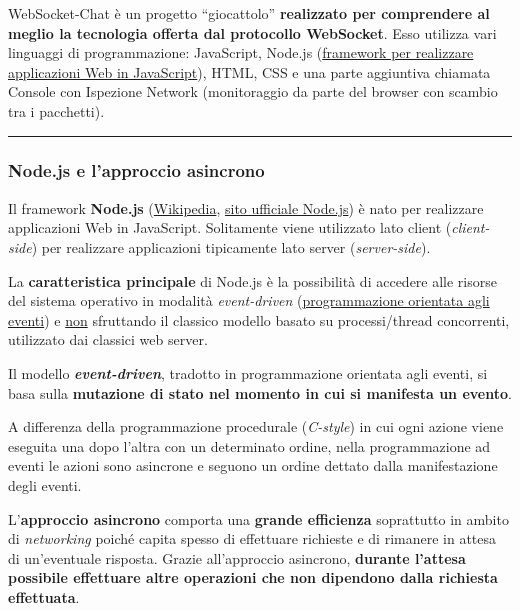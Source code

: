 \documentclass[a4paper]{article}
\newcommand{\longline}{\noindent\rule{\textwidth}{0.4pt}}
\newcommand{\dquotes}[1]{``#1''}
\begin{document}
	WebSocket-Chat è un progetto \dquotes{giocattolo} \textbf{realizzato per comprendere al meglio la tecnologia offerta dal protocollo WebSocket}. Esso utilizza vari linguaggi di programmazione: JavaScript, Node.js (\href{https://it.wikipedia.org/wiki/Node.js}{framework per realizzare applicazioni Web in JavaScript}), HTML, CSS e una parte aggiuntiva chiamata Console con Ispezione Network (monitoraggio da parte del browser con scambio tra i pacchetti).
	
	\longline
	
	\subsubsection{Node.js e l'approccio asincrono}
	
	Il framework \textcolor{Red3}{\textbf{Node.js}} (\href{https://it.wikipedia.org/wiki/Node.js}{Wikipedia}, \href{https://nodejs.org/it}{sito ufficiale Node.js}) è nato per realizzare applicazioni Web in JavaScript. Solitamente viene utilizzato lato client (\emph{client-side}) per realizzare applicazioni tipicamente lato server (\emph{server-side}).\newline
	
	\noindent
	La \textbf{caratteristica principale} di Node.js è la possibilità di accedere alle risorse del sistema operativo in modalità \emph{event-driven} (\href{https://it.wikipedia.org/wiki/Programmazione_a_eventi}{programmazione orientata agli eventi}) e \underline{non} sfruttando il classico modello basato su processi/thread concorrenti, utilizzato dai classici web server.\newline
	
	\noindent
	Il modello \textbf{\emph{event-driven}}, tradotto in programmazione orientata agli eventi, si basa sulla \textbf{mutazione di stato nel momento in cui si manifesta un evento}.
	
	A differenza della programmazione procedurale (\emph{C-style}) in cui ogni azione viene eseguita una dopo l'altra con un determinato ordine, nella programmazione ad eventi le azioni sono asincrone e seguono un ordine dettato dalla manifestazione degli eventi.\newline
	
	\noindent
	L'\textbf{approccio asincrono} comporta una \textcolor{Green4}{\textbf{grande efficienza}} soprattutto in ambito di \emph{networking} poiché capita spesso di effettuare richieste e di rimanere in attesa di un'eventuale risposta. Grazie all'approccio asincrono, \textbf{durante l'attesa possibile effettuare altre operazioni che non dipendono dalla richiesta effettuata}.
	
\end{document}
